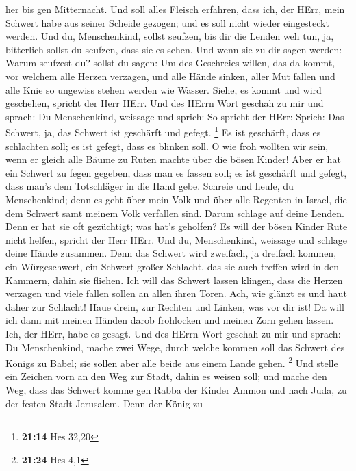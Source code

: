 her bis gen Mitternacht.  Und soll alles Fleisch erfahren,
dass ich, der HErr, mein Schwert habe aus seiner Scheide gezogen; und es
soll nicht wieder eingesteckt werden.  Und du,
Menschenkind, sollst seufzen, bis dir die Lenden weh tun, ja, bitterlich
sollst du seufzen, dass sie es sehen.  Und wenn sie zu dir
sagen werden: Warum seufzest du? sollst du sagen: Um des Geschreies
willen, das da kommt, vor welchem alle Herzen verzagen, und alle Hände
sinken, aller Mut fallen und alle Knie so ungewiss stehen werden wie
Wasser. Siehe, es kommt und wird geschehen, spricht der Herr HErr.
 Und des HErrn Wort geschah zu mir und sprach:
 Du Menschenkind, weissage und sprich: So spricht der HErr:
Sprich: Das Schwert, ja, das Schwert ist geschärft und gefegt.
\footnote{\textbf{21:14} Hes 32,20}  Es ist geschärft, dass
es schlachten soll; es ist gefegt, dass es blinken soll. O wie froh
wollten wir sein, wenn er gleich alle Bäume zu Ruten machte über die
bösen Kinder!  Aber er hat ein Schwert zu fegen gegeben,
dass man es fassen soll; es ist geschärft und gefegt, dass man's dem
Totschläger in die Hand gebe.  Schreie und heule, du
Menschenkind; denn es geht über mein Volk und über alle Regenten in
Israel, die dem Schwert samt meinem Volk verfallen sind. Darum schlage
auf deine Lenden.  Denn er hat sie oft gezüchtigt; was
hat's geholfen? Es will der bösen Kinder Rute nicht helfen, spricht der
Herr HErr.  Und du, Menschenkind, weissage und schlage
deine Hände zusammen. Denn das Schwert wird zweifach, ja dreifach
kommen, ein Würgeschwert, ein Schwert großer Schlacht, das sie auch
treffen wird in den Kammern, dahin sie fliehen.  Ich will
das Schwert lassen klingen, dass die Herzen verzagen und viele fallen
sollen an allen ihren Toren. Ach, wie glänzt es und haut daher zur
Schlacht!  Haue drein, zur Rechten und Linken, was vor dir
ist!  Da will ich dann mit meinen Händen darob frohlocken
und meinen Zorn gehen lassen. Ich, der HErr, habe es gesagt.
 Und des HErrn Wort geschah zu mir und sprach:
 Du Menschenkind, mache zwei Wege, durch welche kommen soll
das Schwert des Königs zu Babel; sie sollen aber alle beide aus einem
Lande gehen. \footnote{\textbf{21:24} Hes 4,1}  Und stelle
ein Zeichen vorn an den Weg zur Stadt, dahin es weisen soll; und mache
den Weg, dass das Schwert komme gen Rabba der Kinder Ammon und nach
Juda, zu der festen Stadt Jerusalem.  Denn der König zu
